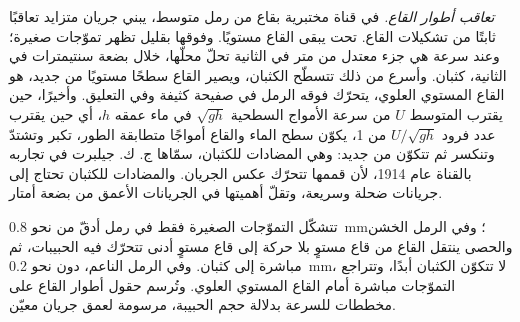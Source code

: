 \emph{تعاقب أطوار القاع.} في قناة مختبرية بقاع من رمل متوسط، يبني جريان متزايد تعاقبًا ثابتًا من تشكيلات القاع. تحت  يبقى القاع مستويًا. وفوقها بقليل تظهر تموّجات صغيرة؛ وعند سرعة هي جزء معتدل من متر في الثانية تحلّ محلّها، خلال بضعة سنتيمترات في الثانية، كثبان. وأسرع من ذلك تتسطّح الكثبان، ويصير القاع سطحًا مستويًا من جديد، هو القاع المستوي العلوي، يتحرّك فوقه الرمل في صفيحة كثيفة وفي التعليق. وأخيرًا، حين يقترب المتوسط $U$ من سرعة الأمواج السطحية $\sqrt{gh}$ في ماء عمقه $h$، أي حين يقترب عدد فرود $U/\sqrt{gh}$ من 1، يكوّن سطح الماء والقاع أمواجًا متطابقة الطور، تكبر وتشتدّ وتنكسر ثم تتكوّن من جديد: وهي المضادات للكثبان، سمّاها ج. ك. جيلبرت في تجاربه بالقناة عام 1914، لأن قممها تتحرّك عكس الجريان. والمضادات للكثبان تحتاج إلى جريانات ضحلة وسريعة، وتقلّ أهميتها في الجريانات الأعمق من بضعة أمتار.

تتشكّل التموّجات الصغيرة فقط في رمل أدقّ من نحو \qty{0.8}{mm}؛ وفي الرمل الخشن والحصى ينتقل القاع من قاع مستوٍ بلا حركة إلى قاع مستوٍ أدنى تتحرّك فيه الحبيبات، ثم مباشرة إلى كثبان. وفي الرمل الناعم، دون نحو \qty{0.2}{mm}، لا تتكوّن الكثبان أبدًا، وتتراجع التموّجات مباشرة أمام القاع المستوي العلوي. وتُرسم حقول أطوار القاع على مخططات للسرعة بدلالة حجم الحبيبة، مرسومة لعمق جريان معيّن.

